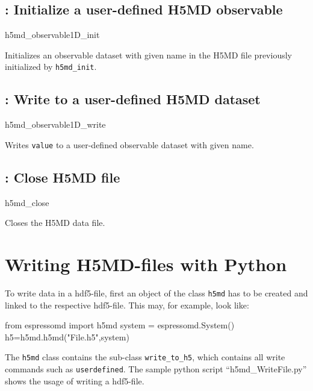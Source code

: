 \subsection{: Initialize a user-defined H5MD
observable}

\begin{essyntax}
h5md_observable1D_init 
  \begin{features}
  \end{features}
\end{essyntax}
Initializes an observable dataset with given name in the H5MD file previously
initialized by \texttt{h5md_init}.

\subsection{: Write to a user-defined H5MD
dataset}

\begin{essyntax}
h5md_observable1D_write  
  \begin{features}
  \end{features}
\end{essyntax}
Writes \texttt{value} to a user-defined observable dataset with given name.

\subsection{: Close H5MD file}

\begin{essyntax}
h5md_close
  \begin{features}
  \end{features}
\end{essyntax}
Closes the H5MD data file.


\section{Writing H5MD-files with Python}
To write data in a hdf5-file, first an object of the class \texttt{h5md} has to be created and linked to the respective hdf5-file. This may, for example, look like:
\begin{pycode}
from espressomd import h5md
system = espressomd.System()
h5=h5md.h5md("File.h5",system)
\end{pycode}
The \texttt{h5md} class contains the sub-class \texttt{write_to_h5}, which contains all write commands such as \texttt{userdefined}. The sample python script ``h5md_WriteFile.py'' shows the usage of writing a hdf5-file.

